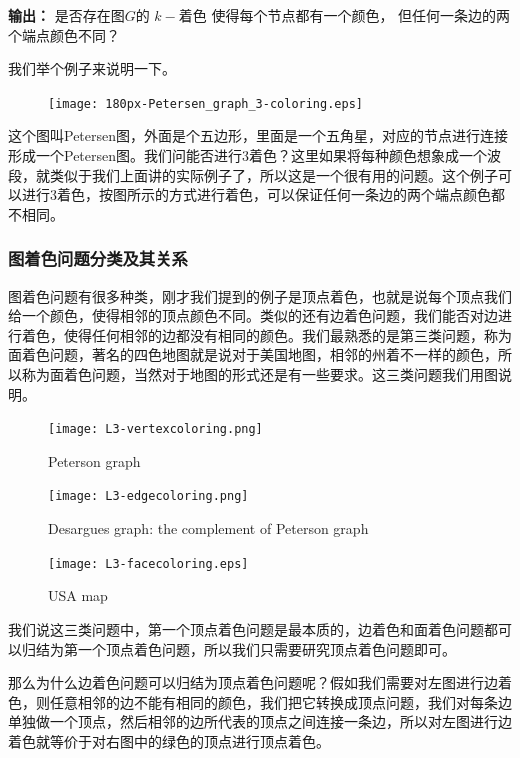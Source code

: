  {\bf 输出：} 是否存在图$G$的 $k-着色$ 使得每个节点都有一个颜色， 但任何一条边的两个端点颜色不同？

 我们举个例子来说明一下。

\begin{figure}[H]
\centering
 \texttt{[image: 180px-Petersen\_graph\_3-coloring.eps]}
\end{figure} 

这个图叫Petersen图，外面是个五边形，里面是一个五角星，对应的节点进行连接形成一个Petersen图。我们问能否进行3着色？这里如果将每种颜色想象成一个波段，就类似于我们上面讲的实际例子了，所以这是一个很有用的问题。这个例子可以进行3着色，按图所示的方式进行着色，可以保证任何一条边的两个端点颜色都不相同。

\subsubsection{图着色问题分类及其关系}
图着色问题有很多种类，刚才我们提到的例子是顶点着色，也就是说每个顶点我们给一个颜色，使得相邻的顶点颜色不同。类似的还有边着色问题，我们能否对边进行着色，使得任何相邻的边都没有相同的颜色。我们最熟悉的是第三类问题，称为面着色问题，著名的四色地图就是说对于美国地图，相邻的州着不一样的颜色，所以称为面着色问题，当然对于地图的形式还是有一些要求。这三类问题我们用图说明。

\begin{figure}[H]
\centering
 \begin{minipage}{0.3\textwidth}
 \texttt{[image: L3-vertexcoloring.png]}
 \caption{  Peterson graph  }
\end{minipage}
\begin{minipage}{0.3\textwidth}
 \texttt{[image: L3-edgecoloring.png]}
 \caption{ Desargues graph: the complement of Peterson graph }
\end{minipage}
\begin{minipage}{0.3\textwidth}
 \texttt{[image: L3-facecoloring.eps]}
 \caption{  USA map }
\end{minipage}
\end{figure}

我们说这三类问题中，第一个顶点着色问题是最本质的，边着色和面着色问题都可以归结为第一个顶点着色问题，所以我们只需要研究顶点着色问题即可。

那么为什么边着色问题可以归结为顶点着色问题呢？假如我们需要对左图进行边着色，则任意相邻的边不能有相同的颜色，我们把它转换成顶点问题，我们对每条边单独做一个顶点，然后相邻的边所代表的顶点之间连接一条边，所以对左图进行边着色就等价于对右图中的绿色的顶点进行顶点着色。

